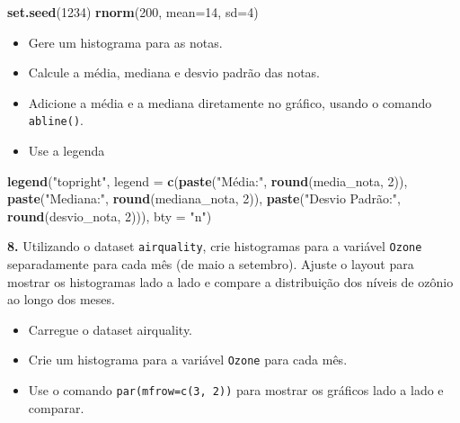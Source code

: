 \documentclass[
]{book}
\newenvironment{Shaded}{\begin{snugshade}}{\end{snugshade}}
\newcommand{\AttributeTok}[1]{\textcolor[rgb]{0.13,0.29,0.53}{#1}}
\newcommand{\DecValTok}[1]{\textcolor[rgb]{0.00,0.00,0.81}{#1}}
\newcommand{\FunctionTok}[1]{\textcolor[rgb]{0.13,0.29,0.53}{\textbf{#1}}}
\newcommand{\NormalTok}[1]{#1}
\newcommand{\StringTok}[1]{\textcolor[rgb]{0.31,0.60,0.02}{#1}}
\providecommand{\tightlist}{%
  \setlength{\itemsep}{0pt}\setlength{\parskip}{0pt}}
\begin{document}
\begin{Shaded}
\begin{Highlighting}[]
\FunctionTok{set.seed}\NormalTok{(}\DecValTok{1234}\NormalTok{)}
\FunctionTok{rnorm}\NormalTok{(}\DecValTok{200}\NormalTok{, }\AttributeTok{mean=}\DecValTok{14}\NormalTok{, }\AttributeTok{sd=}\DecValTok{4}\NormalTok{)}
\end{Highlighting}
\end{Shaded}

\begin{itemize}
\item
  Gere um histograma para as notas.
\item
  Calcule a média, mediana e desvio padrão das notas.
\item
  Adicione a média e a mediana diretamente no gráfico, usando o comando \texttt{abline()}.
\item
  Use a legenda
\end{itemize}

\begin{Shaded}
\begin{Highlighting}[]
\FunctionTok{legend}\NormalTok{(}\StringTok{"topright"}\NormalTok{, }\AttributeTok{legend =} \FunctionTok{c}\NormalTok{(}\FunctionTok{paste}\NormalTok{(}\StringTok{"Média:"}\NormalTok{, }\FunctionTok{round}\NormalTok{(media\_nota, }\DecValTok{2}\NormalTok{)),}
                              \FunctionTok{paste}\NormalTok{(}\StringTok{"Mediana:"}\NormalTok{, }\FunctionTok{round}\NormalTok{(mediana\_nota, }\DecValTok{2}\NormalTok{)),}
                              \FunctionTok{paste}\NormalTok{(}\StringTok{"Desvio Padrão:"}\NormalTok{, }\FunctionTok{round}\NormalTok{(desvio\_nota, }\DecValTok{2}\NormalTok{))),}
       \AttributeTok{bty =} \StringTok{"n"}\NormalTok{)}
\end{Highlighting}
\end{Shaded}

\textbf{8.} Utilizando o dataset \texttt{airquality}, crie histogramas para a
variável \texttt{Ozone} separadamente para cada mês (de maio a setembro).
Ajuste o layout para mostrar os histogramas lado a lado e compare a
distribuição dos níveis de ozônio ao longo dos meses.

\begin{itemize}
\tightlist
\item
  Carregue o dataset airquality.
\item
  Crie um histograma para a variável \texttt{Ozone} para cada mês.
\item
  Use o comando \texttt{par(mfrow=c(3,\ 2))} para mostrar os gráficos lado a
  lado e comparar.
\end{itemize}
\end{document}
